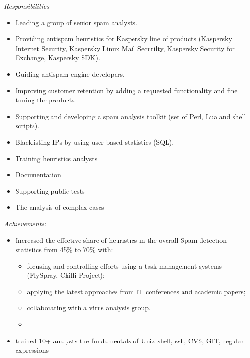 \documentclass[11pt,a4paper,sans]{moderncv}        %
\newcommand{\responsibilities}[1]{ \emph{Responsibilities}:\begin{itemize} #1\end{itemize}}
\newcommand{\achievements}[1]{ \emph{Achievements}:\begin{itemize} #1\end{itemize}}
\begin{document}
 {
    \responsibilities {
        \item Leading a group of senior spam analysts.
        \item Providing antispam heuristics for Kaspersky line of products (Kaspersky Internet Security, Kaspersky Linux Mail Securilty, Kaspersky Security for Exchange, Kaspersky SDK).
        \item Guiding antispam engine developers. %
        \item Improving customer retention by adding a requested functionality and fine tuning the products.
        \item Supporting and developing a spam analysis toolkit (set of Perl, Lua and shell scripts).
        \item Blacklisting IPs by using user-based statistics (SQL). %
        \item Training heuristics analysts
        \item Documentation %
        \item Supporting public tests %
        \item The analysis of complex cases %
    }
    \achievements {        %
        \item Increased the effective share of heuristics in the overall Spam detection statistics from 45\% to 70\% with:
        \begin{itemize}
            \item focusing and controlling efforts using a task management systems (FlySpray, Chilli Project);
            \item applying the latest approaches from IT conferences and academic papers; %
            \item collaborating with a virus analysis group.
            \item %
        \end{itemize}
        \item trained 10+ analysts the fundamentals of Unix shell, ssh, CVS, GIT, regular expressions %
    }
}
\end{document}
